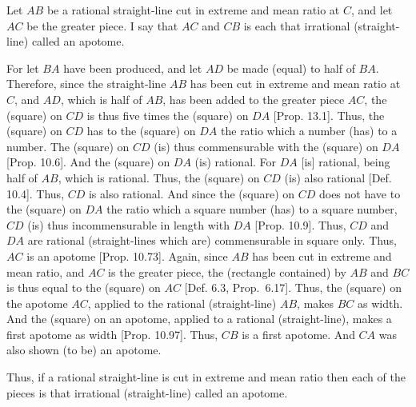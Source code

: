 \begin{Parallel}{}{}
{\epsfysize=0.3in
\centerline{}

Let  $AB$ be a rational straight-line cut in extreme and mean ratio
at $C$, and let $AC$ be the greater piece. I say that  $AC$ and
$CB$ is each that irrational (straight-line) called an apotome.

For let $BA$ have been produced, and let $AD$ be made (equal) to
half of $BA$. Therefore, since the straight-line $AB$ has been cut in
extreme and mean ratio at $C$, and $AD$, which is half of $AB$, has been added to the greater piece $AC$, the (square) on $CD$ is thus 
five times the (square) on $DA$ [Prop. 13.1]. Thus, the (square) on $CD$
has to the (square) on $DA$ the ratio which a number (has) to a number.
The (square) on $CD$ (is) thus commensurable with the (square) on
$DA$ [Prop. 10.6]. And the (square) on $DA$ (is) rational.
For $DA$ [is] rational, being half of $AB$, which is rational.
Thus, the (square) on $CD$ (is) also rational [Def. 10.4]. 
Thus, $CD$ is also rational. And since the (square) on $CD$ does not have to
the (square) on $DA$ the ratio which a square number (has) to a square
number, $CD$ (is) thus incommensurable in length with $DA$ [Prop. 10.9].
Thus, $CD$  and $DA$ are rational (straight-lines which are) commensurable in square only. Thus, $AC$ is an apotome [Prop. 10.73].  Again, since
$AB$ has been cut in extreme and mean ratio, and $AC$ is the greater
piece, the (rectangle contained) by $AB$ and $BC$ is thus equal
to the (square) on $AC$ [Def. 6.3, Prop.~6.17]. Thus, the (square) on
the apotome $AC$, applied to the rational (straight-line) $AB$, makes $BC$
as width. And the (square) on an apotome, applied to a rational
(straight-line), makes a first apotome as width [Prop. 10.97].
Thus, $CB$ is a first apotome. And $CA$ was also
shown (to be) an apotome.

Thus, if a rational straight-line is cut in extreme and mean ratio then each of
the pieces is that irrational (straight-line) called an apotome.}
\end{Parallel}


